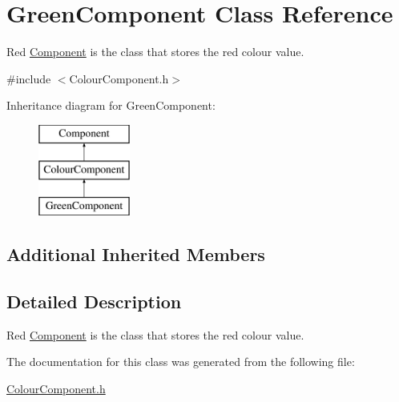 \hypertarget{class_green_component}{}\section{Green\+Component Class Reference}
\label{class_green_component}


Red \mbox{\hyperlink{class_component}{Component}} is the class that stores the red colour value.  




{\ttfamily \#include $<$Colour\+Component.\+h$>$}

Inheritance diagram for Green\+Component\+:\begin{figure}[H]
\begin{center}
\leavevmode
\includegraphics[height=3.000000cm]{class_green_component}
\end{center}
\end{figure}
\subsection*{Additional Inherited Members}


\subsection{Detailed Description}
Red \mbox{\hyperlink{class_component}{Component}} is the class that stores the red colour value. 

The documentation for this class was generated from the following file\+:\begin{DoxyCompactItemize}
\item 
\mbox{\hyperlink{_colour_component_8h}{Colour\+Component.\+h}}\end{DoxyCompactItemize}
